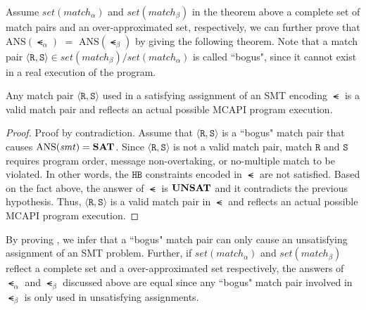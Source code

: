 Assume $\mathit{set(match_{\alpha})}$ and $\mathit{set(match_{\beta})}$ in the theorem above a complete set of match pairs and an over-approximated set, respectively, we can further prove that $\mathrm{ANS}(\smt_{\alpha})$ $ = $ $\mathrm{ANS}(\smt_{\beta})$ by giving the following theorem. Note that a match pair $\langle \mathtt{R},\mathtt{S}\rangle \in \mathit{set(match_{\beta})}/\mathit{set(match_{\alpha})}$ is called ``bogus", since it cannot exist in a real execution of the program.
\\
\begin{theorem} \label{thm:two}
Any match pair $\langle \mathtt{R}, \mathtt{S}\rangle$ used in a satisfying assignment of an SMT encoding $\smt$ is a valid match pair and reflects an actual possible MCAPI program execution.
\end{theorem}
\begin{proof}
Proof by contradiction. Assume that $\langle \mathtt{R},
\mathtt{S}\rangle$ is a ``bogus" match pair that causes
$\mathrm{ANS}(\mathit{smt}) = \textbf{SAT}$. Since $\langle \mathtt{R},
\mathtt{S}\rangle$ is not a valid match pair, match $\mathtt{R}$ and
$\mathtt{S}$ requires program order, message non-overtaking, or
no-multiple match to be violated. In other words, the $\mathtt{HB}$
constraints encoded in $\smt$ are not satisfied. Based on the fact
above, the answer of $\smt$ is $\textbf{UNSAT}$ and it contradicts the
previous hypothesis. Thus, $\langle \mathtt{R}, \mathtt{S}\rangle$ is
a valid match pair in $\smt$ and reflects an actual possible MCAPI
program execution.
\end{proof}

By proving , we infer that a ``bogus" match pair can only cause an unsatisfying assignment of an SMT problem. Further, if $\mathit{set(match_{\alpha})}$ and $\mathit{set(match_{\beta})}$ reflect a complete set and a over-approximated set respectively, the answers of $\smt_{\alpha}$ and $\smt_{\beta}$ discussed above are equal since any ``bogus" match pair involved in $\smt_{\beta}$ is only used in unsatisfying assignments.











